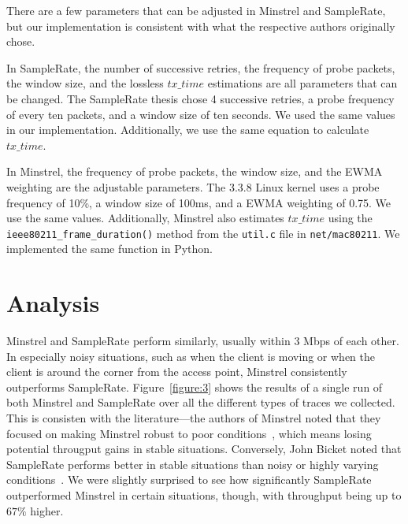 \documentclass[twocolumn,10pt]{article}
\begin{document}
There are a few parameters that can be adjusted in Minstrel and
SampleRate, but our implementation is consistent with what the
respective authors originally chose.

In SampleRate, the number of successive retries, the frequency of
probe packets, the window size, and the lossless $tx\_time$
estimations are all parameters that can be changed.  The SampleRate
thesis chose 4 successive retries, a probe frequency of every ten
packets, and a window size of ten seconds.  We used the same values in
our implementation.  Additionally, we use the same equation to
calculate $tx\_time$.

In Minstrel, the frequency of probe packets, the window size, and the
EWMA weighting are the adjustable parameters.  The 3.3.8 Linux kernel
uses a probe frequency of 10\%, a window size of 100ms, and a EWMA
weighting of 0.75.  We use the same values.  Additionally, Minstrel also
estimates $tx\_time$ using the \texttt{ieee80211\_frame\_duration()}
method from the \texttt{util.c} file in \texttt{net/mac80211}.  We
implemented the same function in Python.


\section{Analysis} \label{sec:analysis}

Minstrel and SampleRate perform similarly, usually within 3 Mbps of
each other.  In especially noisy situations, such as when the client is
moving or when the client is around the corner from the access point,
Minstrel consistently outperforms SampleRate.  Figure~\ref{figure:3}
shows the results of a single run of both Minstrel and SampleRate over
all the different types of traces we collected.  This is consisten with
the literature---the authors of Minstrel noted that they focused on
making Minstrel robust to poor conditions~\cite{minstrel}, which means
losing potential througput gains in stable situations.  Conversely,
John Bicket noted that SampleRate performs better in stable situations
than noisy or highly varying conditions~\cite{samplerate}.  We were
slightly surprised to see how significantly SampleRate outperformed
Minstrel in certain situations, though, with throughput being up to
$67\%$ higher.
\end{document}
